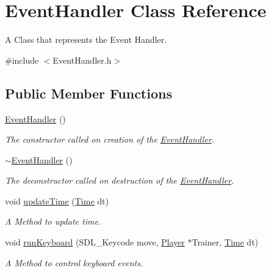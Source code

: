 \hypertarget{class_event_handler}{\section{Event\+Handler Class Reference}
\label{class_event_handler}
}


A Class that represents the Event Handler.  




{\ttfamily \#include $<$Event\+Handler.\+h$>$}

\subsection*{Public Member Functions}
\begin{DoxyCompactItemize}
\item 
\hyperlink{class_event_handler_a8fe27b69582cce5c6a89a0b134bc8158}{Event\+Handler} ()
\begin{DoxyCompactList}\small\item\em The constructor called on creation of the \hyperlink{class_event_handler}{Event\+Handler}. \end{DoxyCompactList}\item 
\hypertarget{class_event_handler_a3decb8cd88ba8af2b9b0b0f0f2fcd722}{\hyperlink{class_event_handler_a3decb8cd88ba8af2b9b0b0f0f2fcd722}{$\sim$\+Event\+Handler} ()}\label{class_event_handler_a3decb8cd88ba8af2b9b0b0f0f2fcd722}

\begin{DoxyCompactList}\small\item\em The deconstructor called on destruction of the \hyperlink{class_event_handler}{Event\+Handler}. \end{DoxyCompactList}\item 
void \hyperlink{class_event_handler_ad81e46a6ca2985314745eb04e2c23714}{update\+Time} (\hyperlink{class_time}{Time} dt)
\begin{DoxyCompactList}\small\item\em A Method to update time. \end{DoxyCompactList}\item 
void \hyperlink{class_event_handler_a76f1deef9364dcdb535a4e8d0e4426d8}{run\+Keyboard} (S\+D\+L\+\_\+\+Keycode move, \hyperlink{class_player}{Player} $\ast$Trainer, \hyperlink{class_time}{Time} dt)
\begin{DoxyCompactList}\small\item\em A Method to control keyboard events. \end{DoxyCompactList}\end{DoxyCompactItemize}
